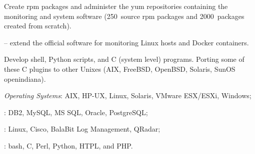 \tinyskip
Create rpm packages and administer the yum repositories containing
the monitoring and system software (250\smallplus~source rpm packages and
2000~packages created from scratch).

\smallskip\noindent
\software
{} --
extend the  official software for monitoring Linux
hosts and Docker containers.

Develop shell, Python scripts, and C (system level) programs.
Porting some of these C plugins to other Unixes
(AIX, FreeBSD, OpenBSD, Solaris, SunOS openindiana).

\tinyskip\noindent
\technologies
{\it Operating Systems\/}:
AIX, HP-UX, Linux, Solaris, VMware ESX/ESXi, Windows;
\par{}: DB2, MySQL, MS SQL, Oracle, PostgreSQL;
\par{}: Linux, Cisco,
BalaBit Log Management, QRadar;
\par{}: bash, C, Perl, Python, HTPL, and PHP.


%
%
%
%

